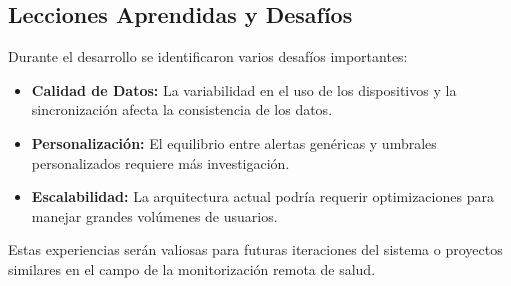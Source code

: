 \subsection{Lecciones Aprendidas y Desafíos}
\label{subsec:lecciones}

Durante el desarrollo se identificaron varios desafíos importantes:

\begin{itemize}
    \item \textbf{Calidad de Datos:} La variabilidad en el uso de los dispositivos y la sincronización afecta la consistencia de los datos.
    \item \textbf{Personalización:} El equilibrio entre alertas genéricas y umbrales personalizados requiere más investigación.
    \item \textbf{Escalabilidad:} La arquitectura actual podría requerir optimizaciones para manejar grandes volúmenes de usuarios.
\end{itemize}

Estas experiencias serán valiosas para futuras iteraciones del sistema o proyectos similares en el campo de la monitorización remota de salud.